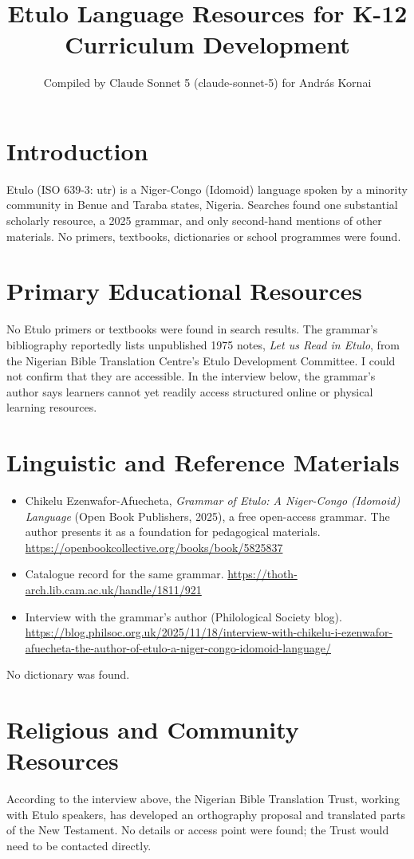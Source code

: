 \documentclass[12pt]{article}
\title{Etulo Language Resources for K-12 Curriculum Development}
\author{Compiled by Claude Sonnet 5 (claude-sonnet-5) for Andr\'as Kornai}
\date{}
\begin{document}
\maketitle

\section{Introduction}
Etulo (ISO 639-3: utr) is a Niger-Congo (Idomoid) language spoken by a minority community in Benue and Taraba states, Nigeria. Searches found one substantial scholarly resource, a 2025 grammar, and only second-hand mentions of other materials. No primers, textbooks, dictionaries or school programmes were found.

\section{Primary Educational Resources}
No Etulo primers or textbooks were found in search results. The grammar's bibliography reportedly lists unpublished 1975 notes, \emph{Let us Read in Etulo}, from the Nigerian Bible Translation Centre's Etulo Development Committee. I could not confirm that they are accessible. In the interview below, the grammar's author says learners cannot yet readily access structured online or physical learning resources.

\section{Linguistic and Reference Materials}
\begin{itemize}
\item Chikelu Ezenwafor-Afuecheta, \emph{Grammar of Etulo: A Niger-Congo (Idomoid) Language} (Open Book Publishers, 2025), a free open-access grammar. The author presents it as a foundation for pedagogical materials. \url{https://openbookcollective.org/books/book/5825837}
\item Catalogue record for the same grammar. \url{https://thoth-arch.lib.cam.ac.uk/handle/1811/921}
\item Interview with the grammar's author (Philological Society blog). \url{https://blog.philsoc.org.uk/2025/11/18/interview-with-chikelu-i-ezenwafor-afuecheta-the-author-of-etulo-a-niger-congo-idomoid-language/}
\end{itemize}
No dictionary was found.

\section{Religious and Community Resources}
According to the interview above, the Nigerian Bible Translation Trust, working with Etulo speakers, has developed an orthography proposal and translated parts of the New Testament. No details or access point were found; the Trust would need to be contacted directly.
\end{document}
